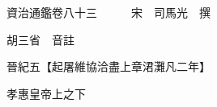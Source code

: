 










 


 
 


 

  
  
  
  
  





  
  
  
  
  
 
  

  

  
  
  



  

 
 

  
   




  

  
  


  　　資治通鑑卷八十三　　　宋　司馬光　撰

　　胡三省　音註

　　晉紀五【起屠維協洽盡上章涒灘凡二年】

　　孝惠皇帝上之下

